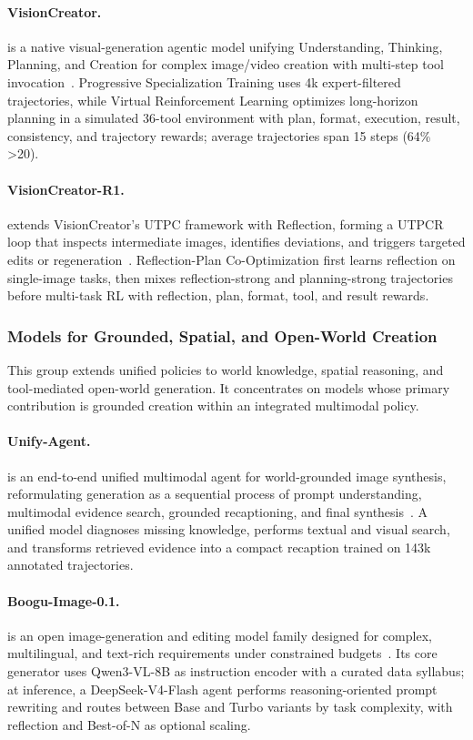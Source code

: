 \paragraph{VisionCreator.}
 is a native visual-generation agentic model unifying Understanding, Thinking, Planning, and Creation for complex image/video creation with multi-step tool invocation~\cite{avg260302681}. Progressive Specialization Training uses 4k expert-filtered trajectories, while Virtual Reinforcement Learning optimizes long-horizon planning in a simulated 36-tool environment with plan, format, execution, result, consistency, and trajectory rewards; average trajectories span 15 steps (64\% >20).



\paragraph{VisionCreator-R1.}
 extends VisionCreator's UTPC framework with Reflection, forming a UTPCR loop that inspects intermediate images, identifies deviations, and triggers targeted edits or regeneration~\cite{avg260308812}. Reflection-Plan Co-Optimization first learns reflection on single-image tasks, then mixes reflection-strong and planning-strong trajectories before multi-task RL with reflection, plan, format, tool, and result rewards.


\subsubsection{Models for Grounded, Spatial, and Open-World Creation}
This group extends unified policies to world knowledge, spatial reasoning, and tool-mediated open-world generation. It concentrates on models whose primary contribution is grounded creation within an integrated multimodal policy.

\paragraph{Unify-Agent.}
 is an end-to-end unified multimodal agent for world-grounded image synthesis, reformulating generation as a sequential process of prompt understanding, multimodal evidence search, grounded recaptioning, and final synthesis~\cite{avg260329620}.  A unified model diagnoses missing knowledge, performs textual and visual search, and transforms retrieved evidence into a compact recaption trained on 143k annotated trajectories.

\paragraph{Boogu-Image-0.1.}
 is an open image-generation and editing model family designed for complex, multilingual, and text-rich requirements under constrained budgets~\cite{avg260713125}. Its core generator uses Qwen3-VL-8B as instruction encoder with a curated data syllabus; at inference, a DeepSeek-V4-Flash agent performs reasoning-oriented prompt rewriting and routes between Base and Turbo variants by task complexity, with reflection and Best-of-N as optional scaling. 

